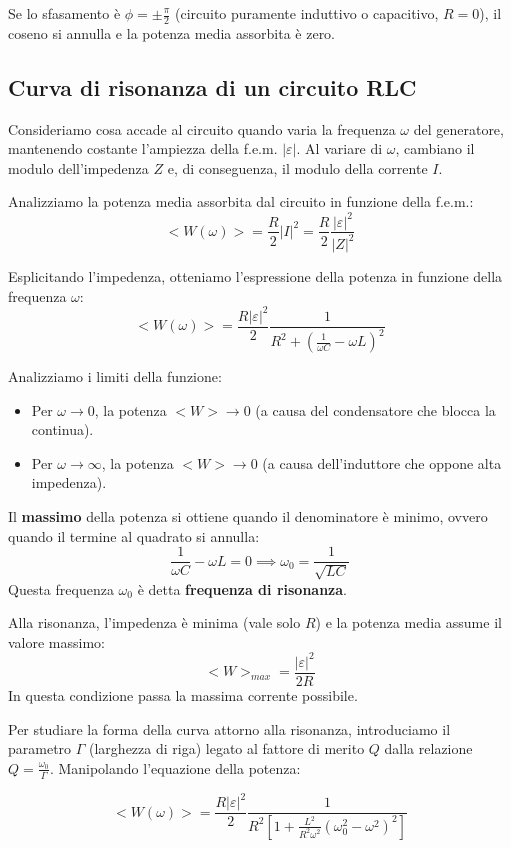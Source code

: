 \documentclass{book}
\begin{document}
Se lo sfasamento è $\phi = \pm \frac{\pi}{2}$ (circuito puramente induttivo o capacitivo, $R=0$), il coseno si annulla e la potenza media assorbita è zero.


 
\subsection{Curva di risonanza di un circuito RLC}

Consideriamo cosa accade al circuito quando varia la frequenza $\omega$ del generatore, mantenendo costante l'ampiezza della f.e.m. $|\varepsilon|$.
Al variare di $\omega$, cambiano il modulo dell'impedenza $Z$ e, di conseguenza, il modulo della corrente $I$.

Analizziamo la potenza media assorbita dal circuito in funzione della f.e.m.:
$$
<W(\omega)> = \frac{R}{2}|I|^2 = \frac{R}{2} \frac{|\varepsilon|^2}{|Z|^2}
$$

Esplicitando l'impedenza, otteniamo l'espressione della potenza in funzione della frequenza $\omega$:
$$
<W(\omega)> = \frac{R|\varepsilon|^2}{2} \frac{1}{R^2 + \left(\frac{1}{\omega C} - \omega L\right)^2}
$$

Analizziamo i limiti della funzione:
\begin{itemize}
    \item Per $\omega \to 0$, la potenza $<W> \to 0$ (a causa del condensatore che blocca la continua).
    \item Per $\omega \to \infty$, la potenza $<W> \to 0$ (a causa dell'induttore che oppone alta impedenza).
\end{itemize}

Il \textbf{massimo} della potenza si ottiene quando il denominatore è minimo, ovvero quando il termine al quadrato si annulla:
$$
\frac{1}{\omega C} - \omega L = 0 \implies \omega_0 = \frac{1}{\sqrt{LC}}
$$
Questa frequenza $\omega_0$ è detta \textbf{frequenza di risonanza}.

Alla risonanza, l'impedenza è minima (vale solo $R$) e la potenza media assume il valore massimo:
$$
<W>_{max} = \frac{|\varepsilon|^2}{2R}
$$
In questa condizione passa la massima corrente possibile.

Per studiare la forma della curva attorno alla risonanza, introduciamo il parametro $\Gamma$ (larghezza di riga) legato al fattore di merito $Q$ dalla relazione $Q=\frac{\omega_0}{\Gamma}$. Manipolando l'equazione della potenza:

$$
<W(\omega)> = \frac{R |\varepsilon|^2}{2} \frac{1}{R^2 \left[1+ \frac{L^2}{R^2 \omega^2 }(\omega_0^2 - \omega^2)^2\right]}
$$
\end{document}
